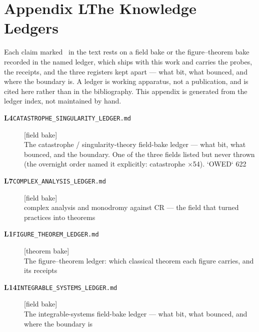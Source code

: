 \clearpage
\section*{Appendix L\quad The Knowledge Ledgers}\label{app:ledgers}
\small\noindent Each claim marked \ldgmarker\ in the text rests on a field bake or the figure--theorem bake recorded in the named ledger, which ships with this work and carries the probes, the receipts, and the three registers kept apart --- what bit, what bounced, and where the boundary is. A ledger is working apparatus, not a publication, and is cited here rather than in the bibliography. This appendix is generated from the ledger index, not maintained by hand.\par\medskip
\begingroup\renewcommand{\arraystretch}{1.25}
\begin{description}
\item[\textbf{L4}\quad\texttt{CATASTROPHE\_SINGULARITY\_LEDGER.md}]\hfill\textsf{[field bake]}\\
The catastrophe / singularity-theory field-bake ledger --- what bit, what bounced, and the boundary. One of the three fields listed but never thrown (the overnight order named it explicitly: catastrophe $\times$54). `OWED` 622
\item[\textbf{L7}\quad\texttt{COMPLEX\_ANALYSIS\_LEDGER.md}]\hfill\textsf{[field bake]}\\
complex analysis and monodromy against CR --- the field that turned practices into theorems
\item[\textbf{L1}\quad\texttt{FIGURE\_THEOREM\_LEDGER.md}]\hfill\textsf{[theorem bake]}\\
The figure--theorem ledger: which classical theorem each figure carries, and its receipts
\item[\textbf{L14}\quad\texttt{INTEGRABLE\_SYSTEMS\_LEDGER.md}]\hfill\textsf{[field bake]}\\
The integrable-systems field-bake ledger --- what bit, what bounced, and where the boundary is
\end{description}
\endgroup
